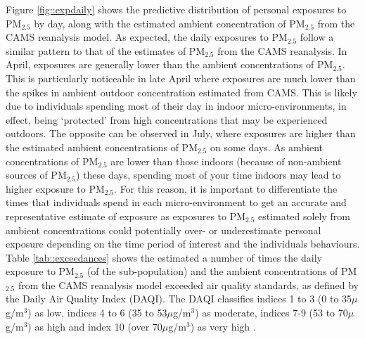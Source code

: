 \documentclass{article}
\begin{document}
\noindent Figure \ref{fig::expdaily} shows the predictive distribution of personal exposures to PM$_{2.5}$ by day, along with the estimated ambient concentration of PM$_{2.5}$ from the CAMS reanalysis model. As expected, the daily exposures to PM$_{2.5}$ follow a similar pattern to that of the estimates of PM$_{2.5}$ from the CAMS reanalysis. In April, exposures are generally lower than the ambient concentrations of PM$_{2.5}$. This is particularly noticeable in late April where exposures are much lower than the spikes in ambient outdoor concentration estimated from CAMS. This is likely due to individuals spending most of their day in indoor micro-environments, in effect, being `protected' from high concentrations that may be experienced outdoors. The opposite can be observed in July, where exposures are higher than the estimated ambient concentrations of PM$_{2.5}$ on some days. As ambient concentrations of PM$_{2.5}$ are lower than those indoors (because of non-ambient sources of PM$_{2.5}$) these days, spending most of your time indoors may lead to higher exposure to PM$_{2.5}$. For this reason, it is important to differentiate the times that individuals spend in each micro-environment to get an accurate and representative estimate of exposure as exposures to PM$_{2.5}$ estimated solely from ambient concentrations could potentially over- or underestimate personal exposure depending on the time period of interest and the individuals behaviours. \\

\noindent Table \ref{tab::exceedances} shows the estimated a number of times the daily exposure to PM$_{2.5}$ (of the sub-population) and the ambient concentrations of PM$_{2.5}$ from the CAMS reanalysis model exceeded air quality standards, as defined by the Daily Air Quality Index (DAQI). The DAQI classifies indices 1 to 3 (0 to 35$\mu$g/m$^3$) as low, indices 4 to 6 (35 to 53$\mu$g/m$^3$) as moderate, indices 7-9 (53 to 70$\mu$g/m$^3$) as high and index 10 (over 70$\mu$g/m$^3$) as very high \citep{DEFRA2020}. 
\end{document}

